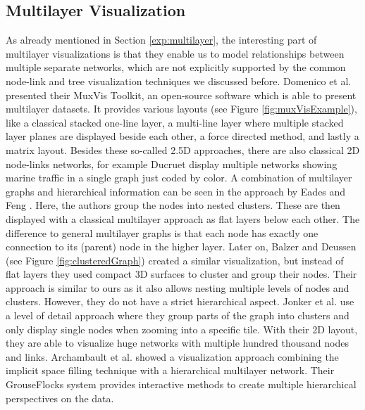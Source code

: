 \subsection{Multilayer Visualization}
As already mentioned in Section \ref{exp:multilayer}, the interesting part of multilayer visualizations is that they enable us to model relationships between multiple separate networks, which are not explicitly supported by the common node-link and tree visualization techniques we discussed before.
Domenico et al. \cite{de_domenico_muxviz_2015} presented their MuxVis Toolkit, an open-source software which is able to present multilayer datasets. It provides various layouts (see Figure \ref{fig:muxVisExample}), like a classical stacked one-line layer, a multi-line layer where multiple stacked layer planes are displayed beside each other, a force directed method, and lastly a matrix layout. Besides these so-called 2.5D approaches, there are also classical 2D node-links networks, for example Ducruet \cite{ducruet_multilayer_nodate} display multiple networks showing marine traffic in a single graph just coded by color. 
A combination of multilayer graphs and hierarchical information can be seen in the approach by Eades and Feng \cite{eades_multilevel_1997}. Here, the authors group the nodes into nested clusters. These are then displayed with a classical multilayer approach as flat layers below each other. The difference to general multilayer graphs is that each node has exactly one connection to its (parent) node in the higher layer. 
Later on, Balzer and Deussen \cite{balzer_level--detail_2007} (see Figure \ref{fig:clusteredGraph}) created a similar visualization, but instead of flat layers they used compact 3D surfaces to cluster and group their nodes. Their approach is similar to ours as it also allows nesting multiple levels of nodes and clusters. However, they do not have a strict hierarchical aspect. 
Jonker et al. \cite{jonker_graph_2017} use a level of detail approach where they group parts of the graph into clusters and only display single nodes when zooming into a specific tile. With their 2D layout, they are able to visualize huge networks with multiple hundred thousand nodes and links.
Archambault et al. \cite{archambault_grouseflocks_2008} showed a visualization approach combining the implicit space filling technique with a hierarchical multilayer network. Their GrouseFlocks system provides  interactive methods to create multiple hierarchical perspectives on the data.

